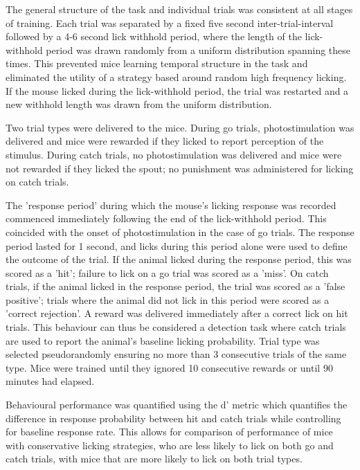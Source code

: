 The general structure of the task and individual trials was consistent at all stages of training. Each trial was separated by a fixed five second inter-trial-interval followed by a 4-6 second lick withhold period, where the length of the lick-withhold period was drawn randomly from a uniform distribution spanning these times. This prevented mice learning temporal structure in the task and eliminated the utility of a strategy based around random high frequency licking. If the mouse licked during the lick-withhold period, the trial was restarted and a new withhold length was drawn from the uniform distribution. 

Two trial types were delivered to the mice. During go trials, photostimulation was delivered and mice were rewarded if they licked to report perception of the stimulus. During catch trials, no photostimulation was delivered and mice were not rewarded if they licked the spout; no punishment was administered for licking on catch trials. 

The 'response period' during which the mouse's licking response was recorded commenced immediately following the end of the lick-withhold period. This coincided with the onset of photostimulation in the case of go trials. The response period lasted for 1 second, and licks during this period alone were used to define the outcome of the trial. If the animal licked during the response period, this was scored as a 'hit'; failure to lick on a go trial was scored as a 'miss'. On catch trials, if the animal licked in the response period, the trial was scored as a 'false positive'; trials where the animal did not lick in this period were scored as a 'correct rejection'. A reward was delivered immediately after a correct lick on hit trials. This behaviour can thus be considered a detection task where catch trials are used to report the animal's baseline licking probability. Trial type was selected pseudorandomly ensuring no more than 3 consecutive trials of the same type. Mice were trained until they ignored 10 consecutive rewards or until 90 minutes had elapsed.

Behavioural performance was quantified using the d' metric \cite{brophy_alternatives_1986} which quantifies the difference in response probability between hit and catch trials while controlling for baseline response rate. This allows for comparison of performance of mice with conservative licking strategies, who are less likely to lick on both go and catch trials, with mice that are more likely to lick on both trial types.


